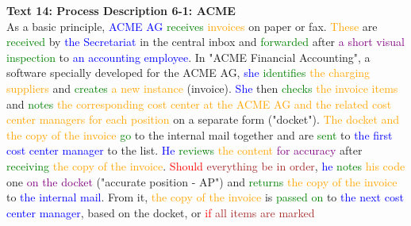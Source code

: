 \textbf{Text 14: Process Description 6-1: ACME}\\
As a basic principle, \textcolor{blue}{ACME} \textcolor{blue}{AG} \textcolor{green}{receives} \textcolor{orange}{invoices} on paper or fax. \textcolor{orange}{These} are \textcolor{green}{received} by \textcolor{blue}{the} \textcolor{blue}{Secretariat} in the central inbox and \textcolor{green}{forwarded} after \textcolor{purple}{a} \textcolor{purple}{short} \textcolor{purple}{visual} \textcolor{green}{inspection} to \textcolor{blue}{an} \textcolor{blue}{accounting} \textcolor{blue}{employee}. In "ACME Financial Accounting", a software specially developed for the ACME AG, \textcolor{blue}{she} \textcolor{green}{identifies} \textcolor{orange}{the} \textcolor{orange}{charging} \textcolor{orange}{suppliers} and \textcolor{green}{creates} \textcolor{orange}{a} \textcolor{orange}{new} \textcolor{orange}{instance} (invoice). \textcolor{blue}{She} then \textcolor{green}{checks} \textcolor{orange}{the} \textcolor{orange}{invoice} \textcolor{orange}{items} and \textcolor{green}{notes} \textcolor{orange}{the} \textcolor{orange}{corresponding} \textcolor{orange}{cost} \textcolor{orange}{center} \textcolor{orange}{at} \textcolor{orange}{the} \textcolor{orange}{ACME} \textcolor{orange}{AG} \textcolor{orange}{and} \textcolor{orange}{the} \textcolor{orange}{related} \textcolor{orange}{cost} \textcolor{orange}{center} \textcolor{orange}{managers} \textcolor{orange}{for} \textcolor{orange}{each} \textcolor{orange}{position} on a separate form ("docket"). \textcolor{orange}{The} \textcolor{orange}{docket} \textcolor{orange}{and} \textcolor{orange}{the} \textcolor{orange}{copy} \textcolor{orange}{of} \textcolor{orange}{the} \textcolor{orange}{invoice} \textcolor{green}{go} to the internal mail together and are \textcolor{green}{sent} to \textcolor{blue}{the} \textcolor{blue}{first} \textcolor{blue}{cost} \textcolor{blue}{center} \textcolor{blue}{manager} to the list. \textcolor{blue}{He} \textcolor{green}{reviews} \textcolor{orange}{the} \textcolor{orange}{content} \textcolor{purple}{for} \textcolor{purple}{accuracy} after \textcolor{green}{receiving} \textcolor{orange}{the} \textcolor{orange}{copy} \textcolor{orange}{of} \textcolor{orange}{the} \textcolor{orange}{invoice}. \textcolor{red}{Should} \textcolor{brown}{everything} \textcolor{brown}{be} \textcolor{brown}{in} \textcolor{brown}{order}, \textcolor{blue}{he} \textcolor{green}{notes} \textcolor{orange}{his} \textcolor{orange}{code} one \textcolor{purple}{on} \textcolor{purple}{the} \textcolor{purple}{docket} ("accurate position - AP") and \textcolor{green}{returns} \textcolor{orange}{the} \textcolor{orange}{copy} \textcolor{orange}{of} \textcolor{orange}{the} \textcolor{orange}{invoice} to \textcolor{blue}{the} \textcolor{blue}{internal} \textcolor{blue}{mail}. From it, \textcolor{orange}{the} \textcolor{orange}{copy} \textcolor{orange}{of} \textcolor{orange}{the} \textcolor{orange}{invoice} is \textcolor{green}{passed} \textcolor{green}{on} to \textcolor{blue}{the} \textcolor{blue}{next} \textcolor{blue}{cost} \textcolor{blue}{center} \textcolor{blue}{manager}, based on the docket, or \textcolor{red}{if} \textcolor{brown}{all} \textcolor{brown}{items} \textcolor{brown}{are} \textcolor{brown}{marked} 